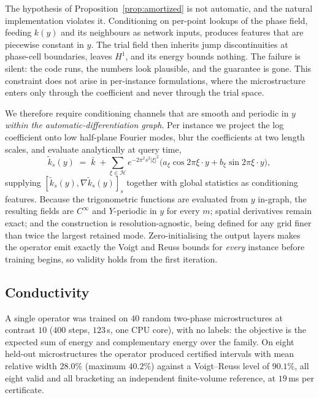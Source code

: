 The hypothesis of Proposition~\ref{prop:amortized} is not automatic, and
the natural implementation violates it. Conditioning on per-point lookups
of the phase field, feeding $k(y)$ and its neighbours as network inputs,
produces features that are piecewise constant in $y$. The trial
field then inherits jump discontinuities at phase-cell boundaries, leaves
$H^1$, and its energy bounds nothing. The failure is silent: the code runs,
the numbers look plausible, and the guarantee is gone. This constraint does
not arise in per-instance formulations, where the microstructure enters
only through the coefficient and never through the trial space.

We therefore require conditioning channels that are smooth and periodic in
$y$ \emph{within the automatic-differentiation graph}. Per instance we
project the log coefficient onto low half-plane Fourier modes, blur the
coefficients at two length scales, and evaluate analytically at query time,
%
\begin{equation}
  \tilde k_s(y) \;=\; \bar k \;+\!\! \sum_{\xi \in \mathcal{H}}\!
  e^{-2\pi^2 s^2 |\xi|^2}
  \big( a_\xi \cos 2\pi \xi\!\cdot\! y + b_\xi \sin 2\pi \xi \!\cdot\! y \big),
  \label{eq:conditioning}
\end{equation}
%
supplying $[\tilde k_s(y), \nabla \tilde k_s(y)]_s$ together with global
statistics as conditioning features. Because the trigonometric functions
are evaluated from $y$ in-graph, the resulting fields are $C^\infty$ and
$Y$-periodic in $y$ for every $m$; spatial derivatives remain exact; and
the construction is resolution-agnostic, being defined for any grid finer
than twice the largest retained mode. Zero-initialising the output layers
makes the operator emit exactly the Voigt and Reuss bounds for
\emph{every} instance before training begins, so validity holds from the
first iteration.

\subsection{Conductivity}
\label{sec:amortized:scalar}

A single operator was trained on $40$ random two-phase microstructures at
contrast $10$ ($400$ steps, $123$\,s, one CPU core), with no labels: the
objective is the expected sum of energy and complementary energy over the
family. On eight held-out microstructures the operator produced certified
intervals with mean relative width $28.0\%$ (maximum $40.2\%$) against a
Voigt--Reuss level of $90.1\%$, all eight valid and all bracketing an
independent finite-volume reference, at $19$\,ms per certificate.

